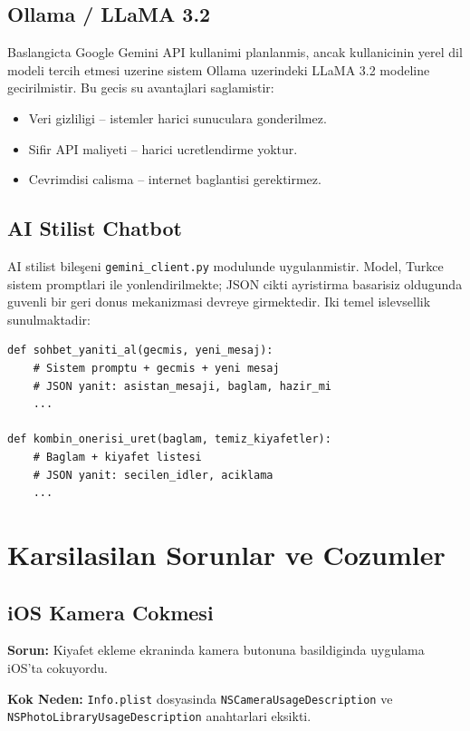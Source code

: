\documentclass[conference]{IEEEtran}
\begin{document}
\subsection{Ollama / LLaMA 3.2}

Baslangicta Google Gemini API kullanimi planlanmis, ancak kullanicinin yerel dil modeli tercih etmesi uzerine sistem Ollama uzerindeki LLaMA 3.2 modeline gecirilmistir. Bu gecis su avantajlari saglamistir:

\begin{itemize}
  \item Veri gizliligi -- istemler harici sunuculara gonderilmez.
  \item Sifir API maliyeti -- harici ucretlendirme yoktur.
  \item Cevrimdisi calisma -- internet baglantisi gerektirmez.
\end{itemize}

\subsection{AI Stilist Chatbot}

AI stilist bileşeni \texttt{gemini\_client.py} modulunde uygulanmistir. Model, Turkce sistem promptlari ile yonlendirilmekte; JSON cikti ayristirma basarisiz oldugunda guvenli bir geri donus mekanizmasi devreye girmektedir. Iki temel islevsellik sunulmaktadir:

\begin{lstlisting}
def sohbet_yaniti_al(gecmis, yeni_mesaj):
    # Sistem promptu + gecmis + yeni mesaj
    # JSON yanit: asistan_mesaji, baglam, hazir_mi
    ...

def kombin_onerisi_uret(baglam, temiz_kiyafetler):
    # Baglam + kiyafet listesi
    # JSON yanit: secilen_idler, aciklama
    ...
\end{lstlisting}

\section{Karsilasilan Sorunlar ve Cozumler}

\subsection{iOS Kamera Cokmesi}

\textbf{Sorun:} Kiyafet ekleme ekraninda kamera butonuna basildiginda uygulama iOS'ta cokuyordu.

\textbf{Kok Neden:} \texttt{Info.plist} dosyasinda \texttt{NSCameraUsageDescription} ve \texttt{NSPhotoLibraryUsageDescription} anahtarlari eksikti.
\end{document}
